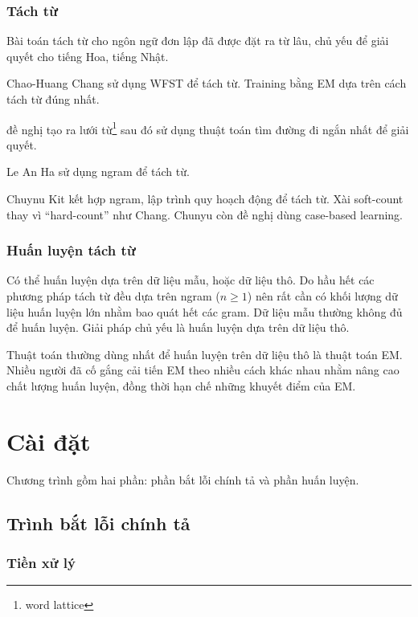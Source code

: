 \documentclass[a4paper]{book}
\begin{document}
\subsection{Tách từ}

Bài toán tách từ cho ngôn ngữ đơn lập đã được đặt ra từ lâu, chủ yếu
để giải quyết cho tiếng Hoa, tiếng Nhật. 

Chao-Huang Chang sử dụng WFST để tách từ. Training bằng EM dựa trên
cách tách từ đúng nhất.

\cite{Ravishankar} đề nghị tạo ra lưới từ\footnote{word lattice} sau
đó sử dụng thuật toán tìm đường đi ngắn nhất để giải quyết.

Le An Ha sử dụng ngram để tách từ.

Chuynu Kit kết hợp ngram, lập trình quy hoạch động để tách từ. Xài
soft-count thay vì ``hard-count'' như Chang. Chunyu còn đề nghị dùng
case-based learning.


\subsection{Huấn luyện tách từ}

Có thể huấn luyện dựa trên dữ liệu mẫu, hoặc dữ liệu thô. Do hầu hết
các phương pháp tách từ đều dựa trên ngram ($n\ge 1$) nên rất cần có
khối lượng dữ liệu huấn luyện lớn nhằm bao quát hết các gram. Dữ liệu
mẫu thường không đủ để huấn luyện. Giải pháp chủ yếu là huấn luyện dựa
trên dữ liệu thô.

Thuật toán thường dùng nhất để huấn luyện trên dữ liệu thô là thuật
toán EM. Nhiều người đã cố gắng cải tiến EM theo nhiều cách khác nhau
nhằm nâng cao chất lượng huấn luyện, đồng thời hạn chế những khuyết
điểm của EM.



\chapter{Cài đặt}

Chương trình gồm hai phần: phần bắt lỗi chính tả và phần huấn luyện.

\section{Trình bắt lỗi chính tả}

\subsection{Tiền xử lý}
\label{sub:preprocess}
\end{document}
